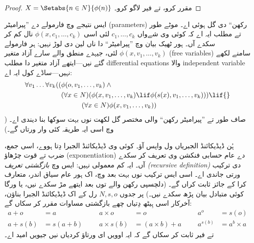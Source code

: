 \documentclass[../../../include/open-logic-section]{subfiles}
\begin{document}
\begin{proof}
$X = \Setabs{n \in N}{\phi(n)}$ مقرر کرو، تے فیر
 لاگو کرو۔
\end{proof}

ایس نتیجے وچ فارمولے دے ”پیرامیٹر (parameters) رکھن“ دی گل ہوئی اے۔
موٹے طور تے مطلب ایہ اے کہ کوئی وی شےواں $c_1, \ldots, c_k$ لئی
اسی $\phi(x, c_1, \ldots, c_k)$ نال کم کر سکدے آں۔ ہور ٹھیک بیان
وچ ”پیرامیٹر“ دا ناں لین دی لوڑ نہیں: ہر فارمولے
$\phi(x, v_1, \ldots, v_k)$ لئی، جیہدے منطق والے سارے آزاد متغیر
(free variables) سامنے لکھے گئے نیں---ایتھے آزاد متغیر دا مطلب
differential equations والا independent variable نہیں---ساڈے کول ایہ اے:
	\begin{align*}
			\forall v_1 \ldots \forall v_k((&\phi(o, v_1,\ldots, v_k) \land {}\\
			&	(\forall x \in N)(\phi(x,v_1, \ldots, v_k) \lif \phi(s(x), v_1,\ldots, v_k))) \lif {}\\
			&\hspace{3em} (\forall x \in N)\phi(x, v_1,\ldots, v_k))
	\end{align*}
صاف طور تے ”پیرامیٹر رکھن“ والی مختصر گل لکھت نوں بہت سوکھا بنا
دیندی اے۔ ( وچ اسی ایہ طریقہ کئی وار ورتاں گے۔)

ہُن ڈیڈیکائنڈ الجبریاں ول واپس آؤ۔ کوئی وی ڈیڈیکائنڈ الجبرا دِتا
ہووے، اسی جمع، ضرب تے قوت چڑھاؤ (exponentiation) دے عام حسابی فنکشن
وی تعریف کر سکدے آں۔ ایہ کم معمولی نہیں: ایس وچ
\emph{بازگشتی تعریف (recursive definition)} دی ترکیب ورتی جاندی اے۔
اسی ایس ترکیب نوں بہت بعد وچ، اک ہور عام سیاق اندر، متعارف کرا کے
جائز ثابت کراں گے۔ (دلچسپی رکھن والے
 توں بعد ایتھے مڑ سکدے نیں، یا
\citealt[pp.~95--8]{Potter2004} ورگا کوئی متبادل بیان پڑھ سکدے نیں۔)
پر جدوں $N, s, o$ رل کے اک ڈیڈیکائنڈ الجبرا بناؤن، آخرکار اسی ہِیٹھ
دِتیاں چھے بازگشتی مساوات مقرر کر سکاں گے:
\begin{align*}
	{a} + {o} &= {a} & & & {a} \times {o} &= {o} & & & {a}^{o} &= s(o)\\
{a} + {s}({b}) &= {s}({a}+{b}) &&& {a} \times {s}({b}) &= ({a}\times {b}) + {a}  & & & {a}^{{s}({b})} &= {a}^{b} \times {a}
\end{align*}
تے فیر ثابت کر سکاں گے کہ ایہ اوویں ای ورتاؤ کردیاں نیں جیویں امید اے۔
\end{document}
